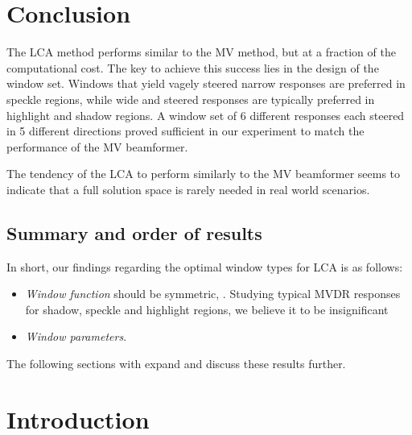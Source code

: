 \documentclass[10pt,journal,draftclsnofoot,onecolumn]{IEEEtran}
\newcommand\Fig[1]{Fig.~\ref{#1}}
\newcommand\1{\vec 1}
\begin{document}
% 
% 


\section{Conclusion}

The LCA method performs similar to the MV method, but at a fraction of the computational cost. The key to achieve this success lies in the design of the window set. Windows that yield vagely steered narrow responses are preferred in speckle regions, while wide and steered responses are typically preferred in highlight and shadow regions. A window set of 6 different responses each steered in 5 different directions proved sufficient in our experiment to match the performance of the MV beamformer.

The tendency of the LCA to perform similarly to the MV beamformer seems to indicate that a full solution space is rarely needed in real world scenarios. 


\subsection{Summary and order of results}

In short, our findings regarding the optimal window types for LCA is as follows:

\begin{itemize}
\item \emph{Window function} should be symmetric, . Studying typical MVDR responses for shadow, speckle and highlight regions, we believe it to be insignificant
\item \emph{Window parameters}. 
\end{itemize}

The following sections with expand and discuss these results further.

\section{Introduction}
\end{document}
